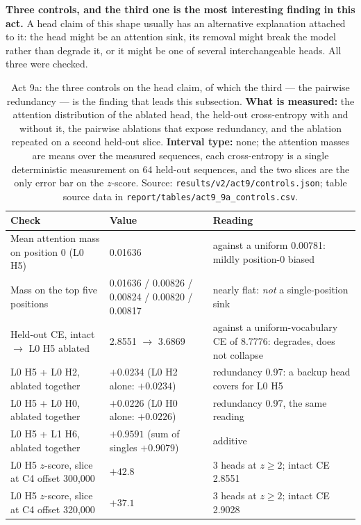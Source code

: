 \documentclass[11pt,a4paper]{article}
\begin{document}
\textbf{Three controls, and the third one is the most interesting finding in
this act.} A head claim of this shape usually has an alternative explanation
attached to it: the head might be an attention sink, its removal might break
the model rather than degrade it, or it might be one of several interchangeable
heads. All three were checked. %

\begin{table}[H]
\centering
\begin{tabular}{L{5.0cm}R{4.0cm}L{5.4cm}}
\toprule
Check & Value & Reading \\
\midrule
Mean attention mass on position 0 (L0 H5) & 0.01636 & against a uniform 0.00781: mildly position-0 biased \\
Mass on the top five positions & 0.01636 / 0.00826 / 0.00824 / 0.00820 / 0.00817 & nearly flat: \emph{not} a single-position sink \\
Held-out CE, intact $\to$ L0 H5 ablated & 2.8551 $\to$ 3.6869 & against a uniform-vocabulary CE of 8.7776: degrades, does not collapse \\
L0 H5 + L0 H2, ablated together & $+0.0234$ (L0 H2 alone: $+0.0234$) & redundancy 0.97: a backup head covers for L0 H5 \\
L0 H5 + L0 H0, ablated together & $+0.0226$ (L0 H0 alone: $+0.0226$) & redundancy 0.97, the same reading \\
L0 H5 + L1 H6, ablated together & $+0.9591$ (sum of singles $+0.9079$) & additive \\
L0 H5 $z$-score, slice at C4 offset 300,000 & $+42.8$ & 3 heads at $z \geq 2$; intact CE 2.8551 \\
L0 H5 $z$-score, slice at C4 offset 320,000 & $+37.1$ & 3 heads at $z \geq 2$; intact CE 2.9028 \\
\bottomrule
\end{tabular}
\caption{Act 9a: the three controls on the head claim, of which the third --- the
pairwise redundancy --- is the finding that leads this subsection.
\textbf{What is measured:} the attention distribution of the ablated head, the
held-out cross-entropy with and without it, the pairwise ablations that expose
redundancy, and the ablation repeated on a second held-out slice.
\textbf{Interval type:} none; the attention masses are means over the
measured sequences, each cross-entropy is a single deterministic measurement
on 64 held-out sequences, and the two slices are the only error bar on the
$z$-score. Source: \texttt{results/v2/act9/controls.json}; table source data
in \texttt{report/tables/act9\_9a\_controls.csv}.}
\label{tab:act9a-controls}
\end{table}
\end{document}
